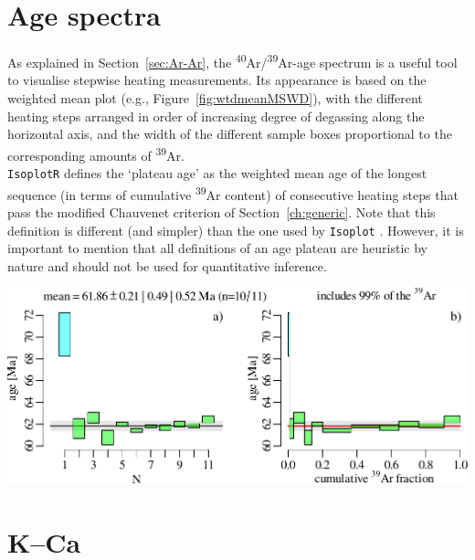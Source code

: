 \begin{refsection}
\section{Age spectra}\label{sec:agespectra}

As explained in Section~\ref{sec:Ar-Ar}, the
\textsuperscript{40}Ar/\textsuperscript{39}Ar-age spectrum is a useful
tool to visualise stepwise heating measurements. Its appearance is
based on the weighted mean plot (e.g., Figure~\ref{fig:wtdmeanMSWD}),
with the different heating steps arranged in order of increasing
degree of degassing along the horizontal axis, and the width of the
different sample boxes proportional to the corresponding amounts of
\textsuperscript{39}Ar.\\

\texttt{IsoplotR} defines the `plateau age' as the weighted mean age
of the longest sequence (in terms of cumulative \textsuperscript{39}Ar
content) of consecutive heating steps that pass the modified Chauvenet
criterion of Section~\ref{ch:generic}. Note that this definition is
different (and simpler) than the one used by \texttt{Isoplot}
\citep{ludwig2003}. However, it is important to mention that all
definitions of an age plateau are heuristic by nature and should not
be used for quantitative inference.

\begin{center}
\includegraphics[width=.85\textwidth]{../figures/agespectrum.pdf}
\captionsetup{width=.85\textwidth}
\label{fig:agespectrum}
\end{center}

\section{K--Ca}\label{sec:K-Ca}


\end{refsection}
